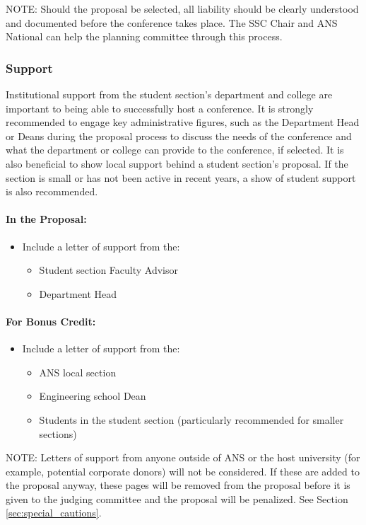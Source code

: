 \documentclass[12pt]{article}
\begin{document}
NOTE: Should the proposal be selected, all liability should be clearly understood and documented before the conference takes place. The SSC Chair and ANS National can help the planning committee through this process.

\subsubsection{Support}
Institutional support from the student section's department and college are important to being able to successfully host a conference.
It is strongly recommended to engage key administrative figures, such as the Department Head or Deans during the proposal process to discuss the needs of the conference and what the department or college can provide to the conference, if selected.
It is also beneficial to show local support behind a student section’s proposal.
If the section is small or has not been active in recent years, a show of student support is also
recommended.

\paragraph{In the Proposal:}
\begin{itemize}
\item Include a letter of support from the:
\begin{itemize}
\item{Student section Faculty Advisor}
\item{Department Head}
\end{itemize}
\end{itemize}

\paragraph{For Bonus Credit:}
\begin{itemize}
\item{Include a letter of support from the:
\begin{itemize}
\item{ANS local section}
\item{Engineering school Dean}
\item{Students in the student section (particularly recommended for smaller sections)}
\end{itemize}
}
\end{itemize}

NOTE: Letters of support from anyone outside of ANS or the host university (for example,
potential corporate donors) will not be considered. If these are added to the
proposal anyway, these pages will be removed from the proposal before it is given to
the judging committee and the proposal will be penalized. See Section \ref{sec:special_cautions}.
\end{document}
